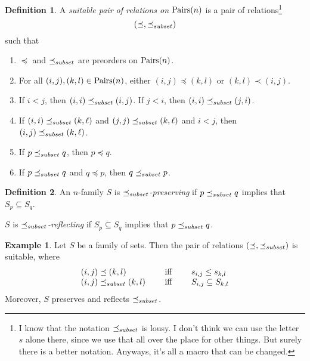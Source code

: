 \documentclass[12pt]{article}
\theoremstyle{definition}
\newtheorem{definition}{Definition}
\newtheorem{example}{Example}
\newcommand{\quadiff}{\quad \mbox{ iff } \quad}
\begin{document}
\begin{definition}
A \emph{suitable pair of relations on $\mbox{Pairs}(n)$} is a pair of relations\footnote{I know that
the notation $\preceq_{\scriptsize subset}$ is lousy.   I don't think we can use the letter $s$ alone there,
since we use that all over the place for other things.    But surely there is a better notation.
Anyways, it's all a macro that can be changed.}
\[ (\preceq, \preceq_{\scriptsize subset}) \]
such that 
\begin{enumerate}
\item $\preceq$ and $\preceq_{\scriptsize subset}$ are preorders on $\mbox{Pairs}(n)$.
\item  
 For all $(i,j), (k,l)\in \mbox{Pairs}(n)$,
 either $(i,j) \preceq (k,l)$ or $(k,l) \prec (i,j)$.
 \item If $i < j$, then $(i,i) \preceq_{\scriptsize subset} (i,j)$.  If $j < i$, then $(i,i) \preceq_{\scriptsize subset} (j,i)$. 
 \item If $(i,i) \preceq_{\scriptsize subset} (k,\ell)$ and $(j,j) \preceq_{\scriptsize subset} (k,\ell)$ and $i < j$,
 then $(i,j) \preceq_{\scriptsize subset} (k,\ell)$.
\item If $p \preceq_{\scriptsize subset} q$, then $p\preceq q$.
\item If $p \preceq_{\scriptsize subset} q$ and $q\preceq p$, then $q \preceq_{\scriptsize subset} p$.
\end{enumerate}
\label{def-suitable-pair}
\end{definition}



\begin{definition}
An $n$-family $S$ is \emph{$\preceq_{\scriptsize subset}$-preserving}
if $p\preceq_{\scriptsize subset} q$ implies that $S_p \subseteq S_q$.

$S$ is \emph{$\preceq_{\scriptsize subset}$-reflecting} if 
$S_p \subseteq S_q$ implies that $p\preceq_{\scriptsize subset} q$. 
\end{definition}


\begin{example} Let  $S$  be a family of sets.
Then the pair of relations $(\preceq, \preceq_{\scriptsize subset})$
is suitable, where 
\[ \begin{array}{lcl}
(i,j) \preceq (k,l) & \quadiff  & s_{i,j} \leq s_{k,l}\\
(i,j) \precsubseteq (k,l) & \quadiff  & S_{i,j} \subseteq S_{k,l}\\
\end{array}
\]
Moreover, $S$ preserves and reflects $\preceq_{\scriptsize subset}$.
\label{example-suitable-pair}
\end{example}


\end{document}
